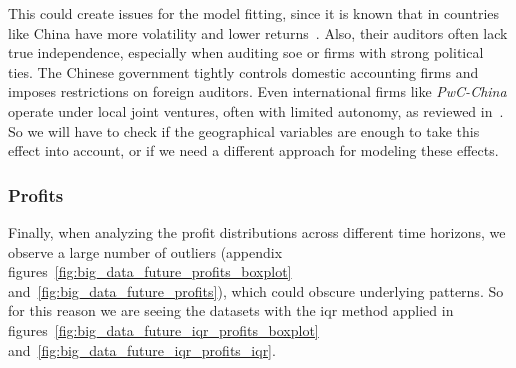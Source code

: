 \documentclass[11pt,english,a4paper,hidelinks]{book}
\begin{document}
\newpage
\noindent This could create issues for the model fitting, since it is known that in countries like China have more volatility and lower returns~\cite{chen2024economic}. Also, their auditors often lack true independence, especially when auditing \gls{soe} or firms with strong political ties. The Chinese government tightly controls domestic accounting firms and imposes restrictions on foreign auditors. Even international firms like \textit{PwC-China} operate under local joint ventures, often with limited autonomy, as reviewed in~\cite{LIU2012782}. So we will have to check if the geographical variables are enough to take this effect into account, or if we need a different approach for modeling these effects.

\subsubsection{Profits}

\noindent Finally, when analyzing the profit distributions across different time horizons, we observe a large number of outliers (appendix figures~\ref{fig:big_data_future_profits_boxplot} and~\ref{fig:big_data_future_profits}), which could obscure underlying patterns. So for this reason we are seeing the datasets with the \acrshort{iqr} method applied in figures~\ref{fig:big_data_future_iqr_profits_boxplot} and~\ref{fig:big_data_future_iqr_profits_iqr}.
\end{document}
